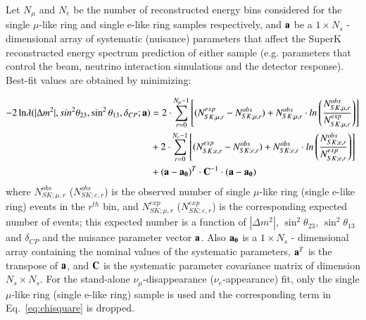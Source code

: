 Let $N_{\mu}$ and $N_{e}$ be the number of reconstructed energy bins
considered for the single $\mu$-like ring and single e-like ring samples respectively, 
and ${\bf a}$ be a $1 \times N_{s}$ - dimensional array of systematic (nuisance) 
parameters that affect the SuperK reconstructed energy spectrum prediction of either sample 
(e.g. parameters that control the beam, neutrino interaction simulations and 
the detector response).
Best-fit values are obtained by minimizing: 

\begin{equation}
\begin {split}
\displaystyle
 -2 \, \textrm{ln} \lambda (|\Delta m^{2}|, sin^{2}\theta_{23}, \sin^{2}\theta_{13}, \delta_{CP}; {\bf a}) &=
  2 \cdot \sum_{r=0}^{N_{\mu}-1}
   \left[
    (N^{exp}_{SK;\mu,r}-N^{obs}_{SK;\mu,r}) + 
     N^{obs}_{SK;\mu,r} \cdot ln\left(\frac{N^{obs}_{SK;\mu,r}}{N^{exp}_{SK;\mu,r}}\right)  
   \right]  \\
    \displaystyle
    &+ 2 \cdot \sum_{r=0}^{N_{e}-1}
    \left[
    (N^{exp}_{SK;e,r}-N^{obs}_{SK;e,r}) + 
     N^{obs}_{SK;e,r} \cdot ln\left(\frac{N^{obs}_{SK;e,r}}{N^{exp}_{SK;e,r}}\right)  
   \right]  \\
  &+  ({\bf a}-{\bf a_{0}})^{T} \cdot {\bf C}^{-1} \cdot ({\bf a}-{\bf a_{0}})
\label{eq:chisquare}
\end{split}
\end{equation}
where
$N^{obs}_{SK;\mu,r}$ ($N^{obs}_{SK;e,r}$) is the observed number of single $\mu$-like ring (single e-like ring) events in the $r^{th}$ bin, 
and $N^{exp}_{SK;\mu,r}$ ($N^{exp}_{SK;e,r}$)
is the corresponding expected number of events; this expected number is a function of 
$|\Delta m^{2}|$, $\sin^{2}\theta_{23}$, $\sin^{2}\theta_{13}$ and $\delta_{CP}$
and the nuisance parameter vector ${\bf a}$.
Also ${\bf a_{0}}$ is a $1 \times N_{s}$ - dimensional array containing the nominal values of
the systematic parameters, ${\bf a}^{T}$ is the transpose of ${\bf a}$,
and ${\bf C}$ is the systematic parameter covariance matrix of dimension $N_{s} \times N_{s}$.
For the stand-alone $\nu_{\mu}$-disappearance ($\nu_{e}$-appearance) fit, 
only the single $\mu$-like ring (single e-like ring) sample is used and the 
corresponding term in Eq.\ \ref{eq:chisquare} is dropped.

